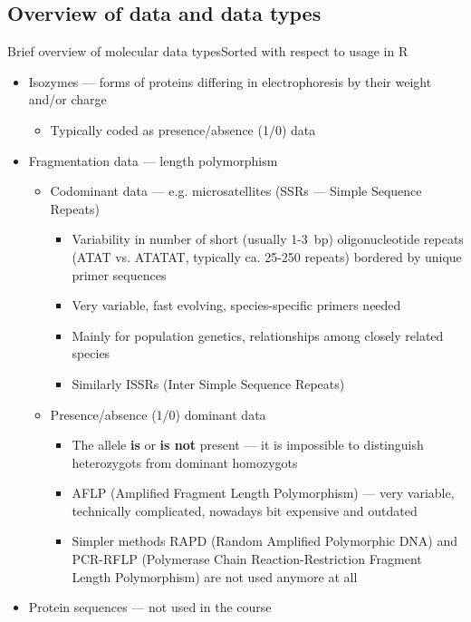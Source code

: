 \documentclass[compress, ucs, xelatex, 11pt, xcolor=svgnames,
  hyperref={
    bookmarks=true,
    unicode=true,
    colorlinks=true,
    pdftitle={Molecular data in R},
    plainpages=false,
    pdfauthor={Vojtech Zeisek},
    pdfsubject={Course about phylogeny and evolution in R},
    pdfcreator={XeLaTeX},
    pdfkeywords={R, evolution, phylogeny, molecular data},
    linkcolor=Tomato,
    anchorcolor=SaddleBrown,
    citecolor=Goldenrod,
    filecolor=DarkMagenta,
    menucolor=Sienna,
    urlcolor=DarkTurquoise,
    pdftex},
  url={hyphens, lowtilde} %
  ]{beamer}
\begin{document}
\subsection[Overview]{Overview of data and data types}

\begin{frame}[allowframebreaks]{Brief overview of molecular data types}{Sorted with respect to usage in R}
  \begin{itemize}
    \item Isozymes --- forms of proteins differing in electrophoresis by their weight and/or charge
    \begin{itemize}
      \item Typically coded as presence/absence (1/0) data
    \end{itemize}
    \item Fragmentation data --- length polymorphism
    \begin{itemize}
      \item Codominant data --- e.g. microsatellites (SSRs --- Simple Sequence Repeats)
      \begin{itemize}
	\item Variability in number of short (usually 1-3~bp) oligonucleotide repeats (ATAT vs. ATATAT, typically ca. 25-250 repeats) bordered by unique primer sequences
	\item Very variable, fast evolving, species-specific primers needed
	\item Mainly for population genetics, relationships among closely related species
	\item Similarly ISSRs (Inter Simple Sequence Repeats)
      \end{itemize}
      \item Presence/absence (1/0) dominant data
      \begin{itemize}
	\item The allele \textbf{is} or \textbf{is not} present  --- it is impossible to distinguish heterozygots from dominant homozygots
	\item AFLP (Amplified Fragment Length Polymorphism) --- very variable, technically complicated, nowadays bit expensive and outdated
	\item Simpler methods RAPD (Random Amplified Polymorphic DNA) and PCR-RFLP (Polymerase Chain Reaction-Restriction Fragment Length Polymorphism) are not used anymore at all
      \end{itemize}
    \end{itemize}
    \item Protein sequences --- not used in the course

\end{itemize}
\end{frame}
\end{document}
